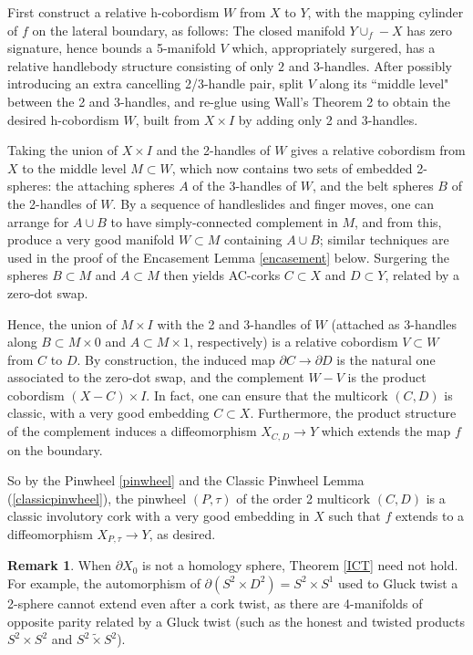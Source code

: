 \documentclass[11pt]{amsart}
\theoremstyle{definition}
\newtheorem*{remark*}{Remark}
\newcommand{\del}{\partial}
\newcommand{\ac}{\textup{AC}}
\begin{document}
First construct a relative h-cobordism $W$ from $X$ to $Y$, with the mapping cylinder of  $f$ on the lateral boundary, as follows: The closed manifold $Y \cup_f -X$ has zero signature, hence bounds a 5-manifold $V$ which, appropriately surgered, has a relative handlebody structure consisting of only $2$ and $3\text{-handles}$. After possibly introducing an extra cancelling 2/3-handle pair, split $V$ along its ``middle level" between the 2 and 3-handles, and re-glue using Wall's Theorem 2 \cite[pg.\ 136]{wall:diffeomorphisms} to obtain the desired h-cobordism $W$, built from $X \times I$ by adding only 2 and 3-handles. 

Taking the union of $X \times I$ and the 2-handles of $W$ gives a relative cobordism from $X$ to the middle level $M \subset W$, which now contains two sets of embedded 2-spheres: the attaching spheres $A$ of the 3-handles of $W$, and the belt spheres $B$ of the 2-handles of $W$. By a sequence of handleslides and finger moves, one can arrange for $A \cup B$ to have simply-connected complement in $M$, and from this, produce a very good manifold $W \subset M$ containing $A \cup B$; similar techniques are used in the proof of the Encasement Lemma \ref{encasement} below.  Surgering the spheres $B\subset M$ and $A\subset M$ then yields \ac-corks $C\subset X$ and $D\subset Y$, related by a zero-dot swap.  

Hence, the union of $M \times I$ with the 2 and 3-handles of $W$ (attached as 3-handles along $B \subset M \times 0$ and $A \subset M \times 1$, respectively) is a relative cobordism $V \subset W$ from $C$ to $D$. By construction, the induced map $\del C \to \del D$ is the natural one associated to the zero-dot swap, %
and the complement $W-V$ is the product cobordism $(X-C)\times I$. In fact, one can ensure that the multicork $(C,D)$ is classic, with a very good embedding $C \subset X$. Furthermore, the product structure of the complement induces a diffeomorphism $X_{C,D} \to Y$ which extends the map $f$ on the boundary. 

So by the Pinwheel \ref{pinwheel} and the Classic Pinwheel Lemma (\ref{classicpinwheel}), the pinwheel $(P,\tau)$ of the order 2 multicork $(C,D)$ is a classic involutory cork with a very good embedding in $X$ such that $f$ extends to a diffeomorphism $X_{P, \tau} \to Y$, as desired.   

\begin{remark*}
When $\del X_0$ is not a homology sphere, Theorem \ref{ICT} need not hold. For example, the automorphism of $\del(S^2 \times D^2) = S^2 \times S^1$ used to Gluck twist a 2-sphere \cite{gluck:2-spheres} cannot extend even after a cork twist, as there are 4-manifolds of opposite parity related by a Gluck twist (such as the honest and twisted products $S^2 \times S^2$ and $S^2 \tilde \times S^2$). 
\end{remark*}
\end{document}
